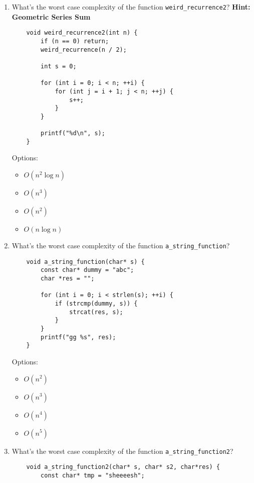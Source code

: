 \documentclass{article}
\begin{document}
\begin{enumerate}
    \item What’s the worst case complexity of the function  \texttt{weird\_recurrence2}? \textbf{Hint: Geometric Series Sum}
    \begin{lstlisting}
    void weird_recurrence2(int n) {
        if (n == 0) return;
        weird_recurrence(n / 2);

        int s = 0;

        for (int i = 0; i < n; ++i) {
            for (int j = i + 1; j < n; ++j) {
                s++;
            }
        }

        printf("%d\n", s);
    }
    \end{lstlisting}
    Options:
    \begin{itemize}
        \item \( O(n^2 \log n) \)
        \item \( O(n^3) \)
        \item \( O(n^2) \) \hl{\checkmark}
        \item \( O(n \log n) \)
    \end{itemize}

    
    \item What’s the worst case complexity of the function \texttt{a\_string\_function}?
    
    \begin{lstlisting}
    void a_string_function(char* s) {
        const char* dummy = "abc";
        char *res = "";

        for (int i = 0; i < strlen(s); ++i) {
            if (strcmp(dummy, s)) {
                strcat(res, s);
            }
        }
        printf("gg %s", res);
    }
    \end{lstlisting}
    Options:
    \begin{itemize}
        \item \( O(n^2) \)
        \item \( O(n^3) \) \hl{\checkmark}
        \item \( O(n^4) \)
        \item \( O(n^5) \)
    \end{itemize}

    \newpage

    \item What’s the worst case complexity of the function \texttt{a\_string\_function2}?
    \begin{lstlisting}
    void a_string_function2(char* s, char* s2, char*res) {
        const char* tmp = "sheeeesh";


\end{lstlisting}
\end{enumerate}
\end{document}
